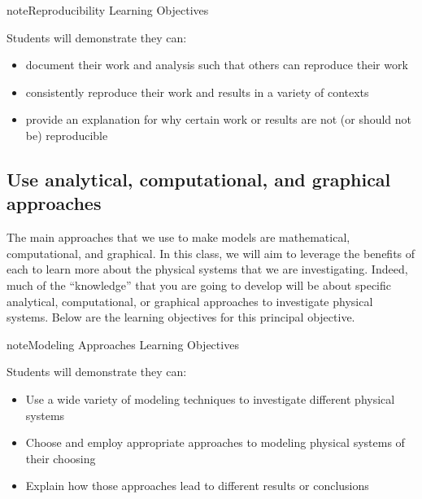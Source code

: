\documentclass[letterpaper,10pt,english]{jupyterBook}
\begin{document}
\begin{sphinxadmonition}{note}{Reproducibility Learning Objectives}

\sphinxAtStartPar
Students will demonstrate they can:
\begin{itemize}
\item {} 
\sphinxAtStartPar
document their work and analysis such that others can reproduce their work

\item {} 
\sphinxAtStartPar
consistently reproduce their work and results in a variety of contexts

\item {} 
\sphinxAtStartPar
provide an explanation for why certain work or results are not (or should not be) reproducible

\end{itemize}
\end{sphinxadmonition}


\subsection{Use analytical, computational, and graphical approaches}
\label{\detokenize{content/0_course/1_goals:use-analytical-computational-and-graphical-approaches}}
\sphinxAtStartPar
The main approaches that we use to make models are mathematical, computational, and graphical. In this class, we will aim to leverage the benefits of each to learn more about the physical systems that we are investigating. Indeed, much of the “knowledge” that you are going to develop will be about specific analytical, computational, or graphical approaches to investigate physical systems. Below are the learning objectives for this principal objective.

\begin{sphinxadmonition}{note}{Modeling Approaches Learning Objectives}

\sphinxAtStartPar
Students will demonstrate they can:
\begin{itemize}
\item {} 
\sphinxAtStartPar
Use a wide variety of modeling techniques to investigate different physical systems

\item {} 
\sphinxAtStartPar
Choose and employ appropriate approaches to modeling physical systems of their choosing

\item {} 
\sphinxAtStartPar
Explain how those approaches lead to different results or conclusions

\end{itemize}
\end{sphinxadmonition}
\end{document}
